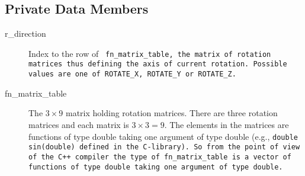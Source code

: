 \subsection{Private Data Members}
 \begin{description}
       \item [r\_direction] Index to the row of \tt
       fn\_matrix\_table\rm,  the matrix of rotation matrices 
       thus defining the axis of current rotation. Possible
       values are one of \tt ROTATE\_X\rm, \tt ROTATE\_Y \rm
       or \tt ROTATE\_Z\rm. 
    
       \item [fn\_matrix\_table] The $3 \times 9$ matrix holding rotation 
       matrices.  There are three rotation matrices and each matrix is
       $3 \times 3 = 9$. The elements in the matrices are
       functions of type double taking one argument of type
       double (e.g., \tt double sin(double) \rm defined in the
       C-library). 
       So from the point of view of the C++ compiler
       the type of \tt fn\_matrix\_table \rm is a vector
       of functions of type double taking one argument of type
       double. 
\end{description} 
    




















